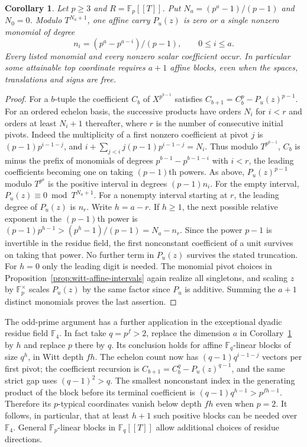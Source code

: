 \documentclass[11pt,letterpaper]{article}
\newtheorem{corollary}[corollary]{Corollary}
\theoremstyle{definition}
\numberwithin{equation}{section}
\begin{document}
\begin{corollary}\label{cor:witt-affine-odd}
Let $p\ge3$ and $R=\mathbb F_p[[T]]$.
Put $N_a=(p^a-1)/(p-1)$ and $N_0=0$. Modulo $T^{N_a+1}$, one
affine carry $P_u(z)$ is zero or a single nonzero monomial of degree
\[
                    n_i=(p^a-p^{a-i})/(p-1),\qquad 0\le i\le a .
\]
Every listed monomial and every nonzero scalar coefficient occur.
In particular some attainable top coordinate requires $a+1$ affine
blocks, even when the spaces, translations and signs are free.
\end{corollary}
\begin{proof}
For a $b$-tuple the coefficient $C_b$ of $X^{p^{b-1}}$ satisfies
$C_{b+1}=C_b^p-P_u(z)^{p-1}$. For an ordered echelon basis, the
successive products have orders $N_i$ for $i<r$ and orders at least
$N_i+1$ thereafter, where $r$ is the number of consecutive initial
pivots. Indeed the multiplicity of a first nonzero coefficient at
pivot $j$ is $(p-1)p^{i-1-j}$, and
$i+\sum_{j<i}j(p-1)p^{i-1-j}=N_i$. Thus modulo $T^{p^{b-1}}$,
$C_b$ is minus the prefix of monomials of degrees
$p^{b-1}-p^{b-1-i}$ with $i<r$, the leading coefficients becoming
one on taking $(p-1)$th powers. As above, $P_u(z)^{p-1}$ modulo
$T^{p^a}$ is the positive interval in degrees $(p-1)n_i$.
For the empty interval, $P_u(z)\equiv0\bmod T^{N_a+1}$.
For a nonempty interval starting at $r$, the leading degree of
$P_u(z)$ is $n_r$. Write $h=a-r$. If $h\ge1$, the next possible
relative exponent in the $(p-1)$th power is
$(p-1)p^{h-1}> (p^h-1)/(p-1)=N_a-n_r$. Since the power
$p-1$ is invertible in the residue field, the first nonconstant
coefficient of a unit survives on taking that power. No further
term in $P_u(z)$ survives the stated truncation. For $h=0$ only
the leading digit is needed. The monomial pivot choices in
Proposition~\ref{prop:witt-affine-intervals} again realize all
singletons, and scaling $z$ by $\mathbb F_p^\times$ scales
$P_u(z)$ by the same factor since $P_u$ is additive. Summing the
$a+1$ distinct monomials proves the last assertion.
\end{proof}

The odd-prime argument has a further application in the exceptional
dyadic residue field $\mathbb F_4$. In fact take $q=p^f>2$, replace
the dimension $a$ in Corollary~\ref{cor:witt-affine-odd} by $h$ and
replace $p$ there by $q$. Its conclusion holds for affine
$\mathbb F_q$-linear blocks of size $q^h$, in Witt depth $fh$.
The echelon count now has $(q-1)q^{i-1-j}$ vectors per first pivot;
the coefficient recursion is $C_{b+1}=C_b^q-P_u(z)^{q-1}$, and
the same strict gap uses $(q-1)^2>q$. The smallest nonconstant
index in the generating product of the block before its terminal
coefficient is $(q-1)q^{h-1}>p^{fh-1}$. Therefore its $p$-typical
coordinates vanish below depth $fh$ even when $p=2$. It follows,
in particular, that at least $h+1$ such positive blocks can be
needed over $\mathbb F_4$. General $\mathbb F_p$-linear blocks in
$\mathbb F_q[[T]]$ allow additional choices of residue directions.
\end{document}
